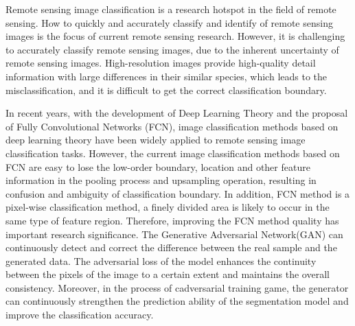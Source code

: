 
\begin{eabstract}
  Remote sensing image classification is a research hotspot in the field of remote sensing. How to quickly and accurately classify and identify  of remote sensing images is the focus of current remote sensing research. However, it is challenging to accurately classify remote sensing images, due to the inherent uncertainty of remote sensing images. High-resolution images provide high-quality detail information with large differences in their similar species, which leads to the misclassification, and it is difficult to get the correct classification boundary.

  In recent years, with the development of Deep Learning Theory and the proposal of Fully Convolutional Networks (FCN), image classification methods based on deep learning theory have been widely applied to remote sensing image classification tasks. However, the current image classification methods based on FCN are easy to lose the low-order boundary, location and other feature information in the pooling process and upsampling operation, resulting in confusion and ambiguity of classification boundary. In addition, FCN method is a pixel-wise classification method, a finely divided area is likely to occur in the same type of feature region. Therefore, improving the FCN method quality has important research significance. The Generative Adversarial Network(GAN) can continuously detect and correct the difference between the real sample and the generated data. The adversarial loss of the model enhances the continuity between the pixels of the image to a certain extent and maintains the overall consistency. Moreover, in the process of cadversarial training game, the generator can continuously strengthen the prediction ability of the segmentation model and improve the classification accuracy.  
  

\end{eabstract}
